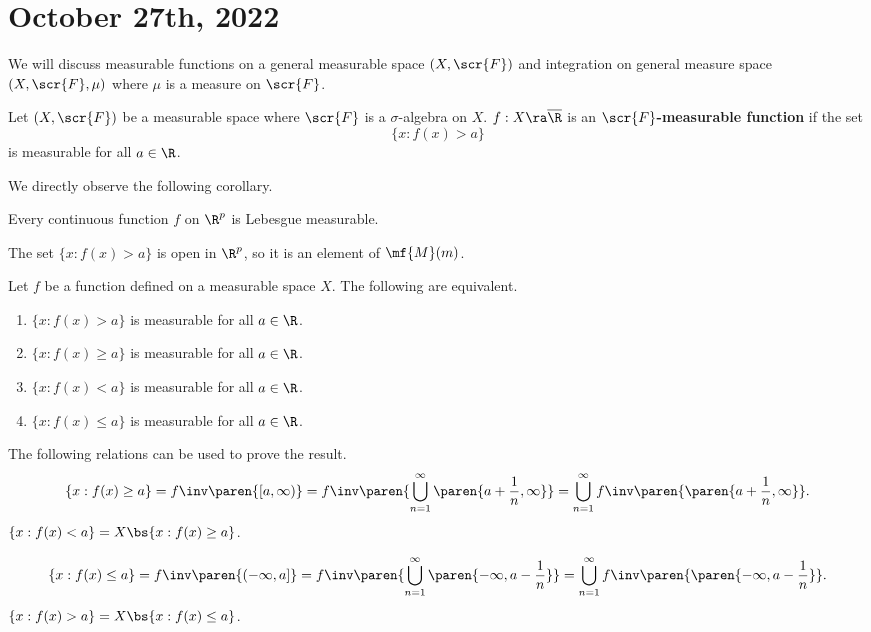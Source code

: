\section*{October 27th, 2022}

We will discuss measurable functions on a general measurable space \((X, \scr{F})\) and integration on general measure space \((X, \scr{F}, \mu)\) where \(\mu\) is a measure on \(\scr{F}\).

  Let \((X, \scr{F})\) be a measurable space where \(\scr{F}\) is a \(\sigma\)-algebra on \(X\). \(f : X \ra \overline{\R}\) is an \textbf{\(\scr{F}\)-measurable function} if the set
\[
    \{x : f(x) > a\}
\]
is measurable for all \(a \in \R\).

We directly observe the following corollary.

\cor Every continuous function \(f\) on \(\R^p\) is Lebesgue measurable.

\pf The set \(\{x : f(x) > a\}\) is open in \(\R^p\), so it is an element of \(\mf{M}(m)\).

 Let \(f\) be a function defined on a measurable space \(X\). The following are equivalent.
\begin{enumerate}
    \item \(\{x : f(x) > a\}\) is measurable for all \(a \in \R\).
    \item \(\{x : f(x) \geq a\}\) is measurable for all \(a \in \R\).
    \item \(\{x : f(x) < a\}\) is measurable for all \(a \in \R\).
    \item \(\{x : f(x) \leq a\}\) is measurable for all \(a \in \R\).
\end{enumerate}

\pf The following relations can be used to prove the result.\\
 \vspace*{-10px}
\begin{equation*}
    \{x : f(x) \geq a\} = f\inv\paren{[a, \infty)} = f\inv\paren{\bigcup_{n=1}^{\infty} \paren{a + \frac{1}{n}, \infty}} = \bigcup_{n=1}^{\infty} f\inv\paren{\paren{a + \frac{1}{n}, \infty}}.
\end{equation*}
 \(\{x : f(x) < a\} = X \bs \{x : f(x) \geq a\}\).

 \vspace*{-10px}
\[
    \{x : f(x) \leq a\} = f\inv \paren{(-\infty, a]} = f\inv\paren{\bigcup_{n=1}^{\infty} \paren{-\infty, a - \frac{1}{n}}} = \bigcup_{n=1}^{\infty} f\inv\paren{\paren{-\infty, a - \frac{1}{n}}}.
\]
 \(\{x : f(x) > a\} = X \bs \{x : f(x) \leq a\}\).

